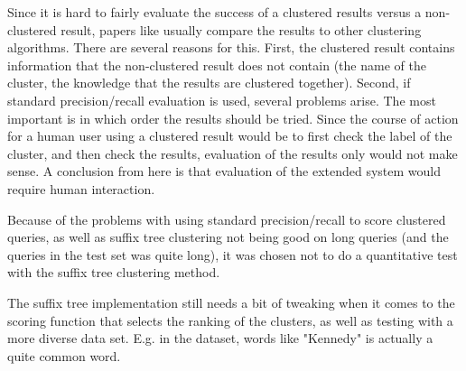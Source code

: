 Since it is hard to fairly evaluate the success of a clustered results versus a non-clustered result, papers like \cite{zamir} usually compare the results to other clustering algorithms. There are several reasons for this. First, the clustered result contains information that the non-clustered result does not contain (the name of the cluster, the knowledge that the results are clustered together). Second, if standard precision/recall evaluation is used, several problems arise. The most important is in which order the results should be tried. Since the course of action for a human user using a clustered result would be to first check the label of the cluster, and then check the results, evaluation of the results only would not make sense. A conclusion from here is that evaluation of the extended system would require human interaction. 

Because of the problems with using standard precision/recall to score clustered queries, as well as suffix tree clustering not being good on long queries (and the queries in the test set was quite long), it was chosen not to do a quantitative test with the suffix tree clustering method. 

The suffix tree implementation still needs a bit of tweaking when it comes to the scoring function that selects the ranking of the clusters, as well as testing with a more diverse data set. E.g. in the dataset, words like "Kennedy" is actually a quite common word.